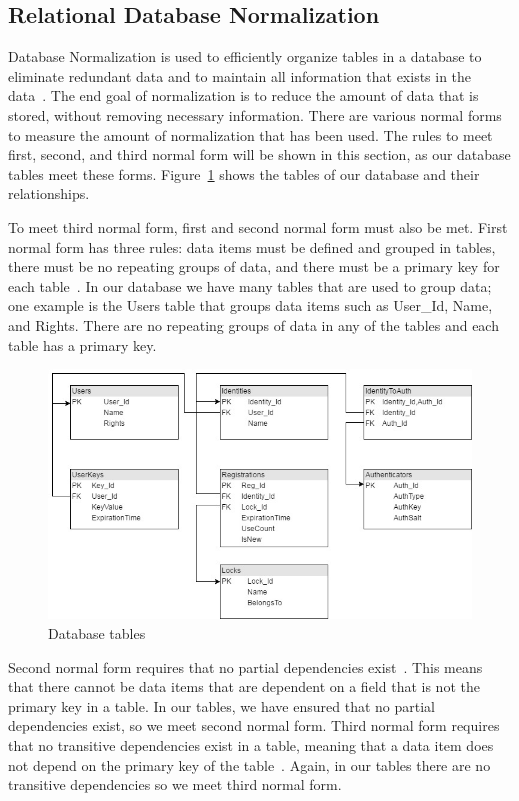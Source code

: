 \documentclass[12pt]{report}
\let\Oldsubsection\subsection
\renewcommand{\subsection}{\FloatBarrier\Oldsubsection}
\begin{document}
\subsection{Relational Database Normalization} \label{relational-database-normalization}

Database Normalization is used to efficiently organize tables in a database to eliminate redundant
data and to maintain all information that exists in the data~\autocite{DBNORMALIZATION}.
The end goal of normalization is to
reduce the amount of data that is stored, without removing necessary information. There are various
normal forms to measure the amount of normalization that has been used. The rules to meet first,
second, and third normal form will be shown in this section, as our database tables meet these forms.
Figure~\ref{fig:db-tables} shows the tables of our database and their relationships.

To meet third normal form, first and second normal form must also be met. First normal form
has three rules: data items must be defined and grouped in tables, there must be no repeating
groups of data, and there must be a primary key for each table~\autocite{FIRSTNORMALFORM}.
In our database we have many tables
that are used to group data; one example is the Users table that groups data items such as User\_Id,
Name, and Rights. There are no repeating groups of data in any of the tables and each table has a
primary key.

\begin{figure}
    \includegraphics[width=\textwidth]{Diagrams/Server_Diagrams/DB_Tables}
    \caption{Database tables}
    \label{fig:db-tables}
\end{figure}

Second normal form requires that no partial dependencies exist~\autocite{SECONDNORMALFORM}. This means that there
cannot be data items that are dependent on a field that is not the primary key in a table. In our
tables, we have ensured that no partial dependencies exist, so we meet second normal form.
Third normal form requires that no transitive dependencies exist in a table, meaning that a data item
does not depend on the primary key of the table~\autocite{THIRDNORMALFORM}. Again, in our tables there
are no transitive dependencies so we meet third normal form.
\end{document}
